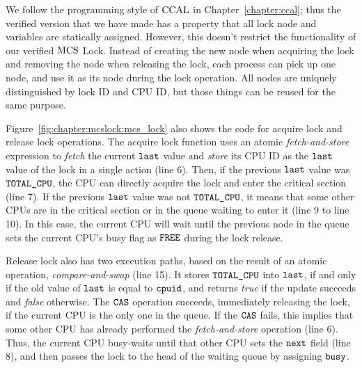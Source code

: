We follow the programming style of $\mathrm{CCAL}$ in Chapter~\ref{chapter:ccal}; thus
the verified version that we have made has a property that all lock node and variables are statically assigned.
However, this doesn't restrict the functionality of our verified $\mathrm{MCS}$ Lock.
Instead of creating the new node when acquiring the lock and removing the node when releasing the lock,
each process can pick up one node, and use it as its node during the lock operation. 
All nodes are uniquely distinguished by lock ID and CPU ID, but those
things can be reused for the same purpose.

Figure~\ref{fig:chapter:mcslock:mcs_lock} also shows the code for  acquire lock and
release lock operations.  The acquire lock function uses an atomic {\em
fetch-and-store} expression to {\em fetch} the current ${\mathrm{\texttt{last}}}$
value and {\em store} its CPU ID as the ${\mathrm{\texttt{last}}}$ value of
the lock in a single action (line 6).  Then, if the previous ${\mathrm{\texttt{last}}}$ value
was ${\mathrm{\texttt{TOTAL\_CPU}}}$, the CPU can directly acquire the lock and enter the
critical section (line 7).  If the previous ${\mathrm{\texttt{last}}}$ value was not
${\mathrm{\texttt{TOTAL\_CPU}}}$, it means that some other CPUs are in the critical
section or in the queue waiting to enter it (line 9 to line 10).  In
this case, the current CPU will wait until the previous node in the
queue sets the current CPU's busy flag as ${\mathrm{\texttt{FREE}}}$ during the lock
release.

Release lock also has two execution paths, based on the result of an atomic operation, {\em compare-and-swap} (line 15).
It stores ${\mathrm{\texttt{TOTAL\_CPU}}}$ into ${\mathrm{\texttt{last}}}$, if and only if the old value
of ${\mathrm{\texttt{last}}}$ is equal to ${\mathrm{\texttt{cpuid}}}$, and returns {\em
  true} if the update succeeds and {\em false} otherwise.
The ${\mathrm{\texttt{CAS}}}$ operation succeeds, immediately releasing the lock,
if the current CPU is the only one in the queue.
If the ${\mathrm{\texttt{CAS}}}$ fails, this implies that some other CPU has
already performed the {\em fetch-and-store} operation (line 6). Thus, the current CPU busy-waits until that other CPU sets the
${\mathrm{\texttt{next}}}$ field  (line 8), and then passes the lock to the head of the
waiting queue by assigning ${\mathrm{\texttt{busy}}}$.

